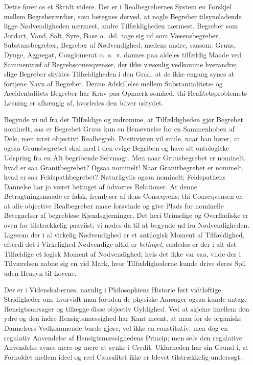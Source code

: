 \documentclass[12pt]{article}
\newcommand{\opage}[1]{\marginnote{\footnotesize\textit{[#1]}}}
\begin{document}
Dette fører os et Skridt videre. Der er i Realbegrebernes System en
Forskjel mellem Begrebsværdier, som betegnes derved, at nogle
Begreber tilsyneladende ligge Nødvendigheden nærmest, andre
Tilfældigheden nærmest. Begreber som Jordart, Vand, Salt, Syre, Base
o.\ dsl. tage sig ud som Væsensbegreber, Substansbegreber, Begreber
af Nødvendighed; medens andre, saasom: Gruus, Dynge, Aggregat,
Conglomerat o.\ s.\ v. dannes paa aldeles tilfældig Maade ved
Sammentræf af Begrebsconseqvenser, der ikke væsenlig vedkomme
hverandre; slige Begreber skyldes Tilfældigheden i den Grad, at de
ikke engang synes at fortjene Navn af Begreber. Denne Adskillelse
mellem Substantialitets- og Accidentalitets-Begreber har Krav paa
Opmærk%
\opage{48}somhed, thi Realitetsproblemets Løsning er afhængig af, hvorledes
den bliver udtydet.

Begynde vi ud fra det Tilfældige og indrømme, at Tilfældigheden
gjør Begrebet nominelt, saa er Begrebet Gruus kun en Benævnelse for
en Sammenhoben af Dele, men intet objectivt Realbegreb. Positivisten
vil smile, naar han hører, at ogsaa Gruusbegrebet skal med i den
evige Begriben og have sit ontologiske Udspring fra en Alt
begribende Selvmagt. Men naar Gruusbegrebet er nominelt, hvad er saa
Granitbegrebet? Ogsaa nominelt! Naar Granitbegrebet er nominelt,
hvad er saa Feldspathbegrebet? Naturligviis ogsaa nominelt;
Feldspathens Dannelse har jo været betinget af udvortes Relationer.
At denne Betragtningsmaade er falsk, fremlyser af dens Conseqvens;
thi Conseqvensen er, at alle objective Realbegreber maae forsvinde
og give Plads for nominelle Betegnelser af begrebløse
Kjendsgjerninger. Det heri Urimelige og Overfladiske er oven for
tilstrækkelig paaviist; vi nødes da til at begynde ud fra
Nødvendigheden. Ligesom der i al virkelig Nødvendighed er et
antilogisk Moment af Tilfældighed, efterdi det i Virkelighed
Nødvendige altid er \emph{betinget}, saaledes er der i alt det
Tilfældige et logisk Moment af Nødvendighed; hvis det ikke var saa,
vilde der i Tilværelsen aabne sig en vid Mark, hvor
Tilfældighederne kunde drive deres Spil uden Hensyn til Lovene.

Der er i Videnskabernes, navnlig i Philosophiens Historie ført
vidtløftige Stridigheder om, hvorvidt man foruden de physiske
Aarsager ogsaa kunde antage Hensigtsaarsager og tillægge disse
objectiv Gyldighed. Ved at skjelne imellem den ydre og den indre
Hensigtsmæssighed har Kant meent, at man for de organiske
Dannelsers Vedkommende burde gjøre, vel ikke en constitutiv, men
dog en regulativ Anvendelse af Hensigtsmæssighedens Princip; men
selv den regulative Anvendelse synes mere og mere at synke i Credit.
Uklarheden har sin Grund i, at Forholdet mellem ideel og reel
Causalitet ikke er blevet tilstrækkelig undersøgt.
\end{document}
